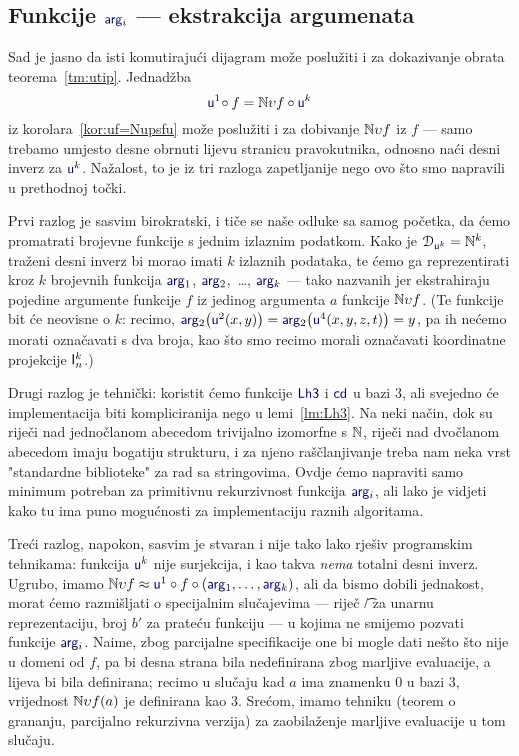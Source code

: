 \subsection{Funkcije \texorpdfstring{$\f{arg}_i$}{arg} --- ekstrakcija argumenata}\label{sec:arg}

Sad je jasno da isti komutirajući dijagram može poslužiti i za dokazivanje obrata teorema~\ref{tm:utip}. Jednadžba
\begin{equation}
    \f u^1\!\circ f=\N\upsilon f\circ\f u^k
\end{equation}
iz korolara~\ref{kor:uf=Nupsfu} može poslužiti i za dobivanje ${\mathbb N}\upsilon f$ iz $f$ --- samo trebamo umjesto desne obrnuti lijevu stranicu pravokutnika, odnosno naći desni inverz za $\f u^k$. Nažalost, to je iz tri razloga zapetljanije nego ovo što smo napravili u prethodnoj točki.

Prvi razlog je sasvim birokratski, i tiče se naše odluke sa samog početka, da ćemo promatrati brojevne funkcije s jednim izlaznim podatkom. Kako je $\dom{\f u^k}=\N^k$, traženi desni inverz bi morao imati $k$ izlaznih podataka, te ćemo ga reprezentirati kroz $k$ brojevnih funkcija $\f{arg}_1$, $\f{arg}_2$,~\ldots, $\f{arg}_k$ --- tako nazvanih jer ekstrahiraju pojedine argumente funkcije $f$ iz jedinog argumenta $a$ funkcije ${\mathbb N}\upsilon f$. (Te funkcije bit će neovisne o $k$: recimo, $\f{arg}_2\bigl(\f u^2(x,y)\bigr)=\f{arg}_2\bigl(\f u^4(x,y,z,t)\bigr)=y$, pa ih nećemo morati označavati s dva broja, kao što smo recimo morali označavati koordinatne projekcije $\f I_n^k$.)

Drugi razlog je tehnički: koristit ćemo funkcije $\f{Lh3}$ i $\f{cd}$ u bazi $3$, ali svejedno će implementacija biti kompliciranija nego u lemi~\ref{lm:Lh3}. Na neki način, dok su riječi nad jednočlanom abecedom trivijalno izomorfne s ${\mathbb N}$, riječi nad dvočlanom abecedom imaju bogatiju strukturu, i za njeno raščlanjivanje treba nam neka vrst "standardne biblioteke" za rad sa stringovima. Ovdje ćemo napraviti samo minimum potreban za primitivnu rekurzivnost funkcija $\f{arg}_i$, ali lako je vidjeti kako tu ima puno mogućnosti za implementaciju raznih algoritama.

Treći razlog, napokon, sasvim je stvaran i nije tako lako rješiv programskim tehnikama: funkcija $\f u^k$ nije surjekcija, i kao takva \emph{nema} totalni desni inverz. Ugrubo, imamo $\N\upsilon f\approx\f u^1\circ f\circ(\f{arg}_1,\dotsc,\f{arg}_k)$, ali da bismo dobili jednakost, morat ćemo razmišljati o specijalnim slučajevima --- riječ \t/ za unarnu reprezentaciju, broj $b'$ za prateću funkciju --- u kojima ne smijemo pozvati funkcije $\f{arg}_i$. Naime, zbog parcijalne specifikacije one bi mogle dati nešto što nije u domeni od $f$, pa bi desna strana bila nedefinirana zbog marljive evaluacije, a lijeva bi bila definirana; recimo u slučaju kad $a$ ima znamenku $0$ u bazi $3$, vrijednost ${\mathbb N}\upsilon f(a)$ je definirana kao $3$. Srećom, imamo tehniku (teorem o grananju, parcijalno rekurzivna verzija) za zaobilaženje marljive evaluacije u tom slučaju.

